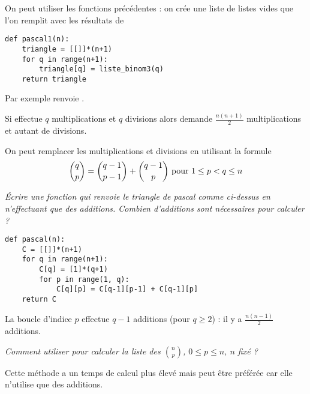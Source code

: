 \medskip

On peut utiliser les fonctions précédentes : on crée une liste de listes vides que l'on remplit avec les résultats de 
\begin{lstlisting}
def pascal1(n):
    triangle = [[]]*(n+1)
    for q in range(n+1):
        triangle[q] = liste_binom3(q)
    return triangle
\end{lstlisting}

Par exemple  renvoie \type{[[1], [1, 1], [1, 2, 1], [1, 3, 3, 1], [1, 4, 6, 4, 1]]}.

Si  effectue $q$ multiplications et $q$ divisions alors  demande $\frac{n(n+1)}2$ multiplications et autant de divisions.

On peut remplacer les multiplications et divisions en utilisant la formule 
\[\binom qp = \binom{q-1}{p-1} + \binom{q-1}{p}\hbox{ pour }1\le p < q \le n\]
\begin{Exercise}[label=exo:pascal]
\it Écrire une fonction  qui renvoie le triangle de pascal comme ci-dessus en n'effectuant que des additions.
Combien d'additions sont nécessaires pour calculer  ?
\end{Exercise}
\begin{Answer}
\begin{lstlisting}
def pascal(n):
    C = [[]]*(n+1)
    for q in range(n+1):
        C[q] = [1]*(q+1)
        for p in range(1, q):
            C[q][p] = C[q-1][p-1] + C[q-1][p]
    return C
\end{lstlisting}

La boucle d'indice $p$ effectue $q-1$ additions (pour $q\ge 2$) : il y a $\frac{n(n-1)}2$ additions. 
\end{Answer}
\begin{Exercise}
\it Comment utiliser  pour calculer la liste des $\binom np$, $0\le p \le n$, $n$ fixé ?
\end{Exercise}
\begin{Answer}
\end{Answer}
Cette méthode a un temps de calcul plus élevé mais peut être préférée car elle n'utilise que des additions.

